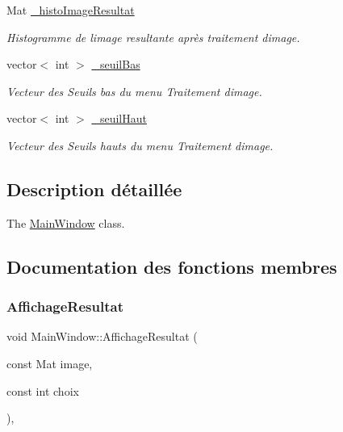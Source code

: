 \begin{DoxyCompactItemize}
\mbox{\label{classMainWindow_a4b3f8fe0c509133a0781edf94c0ae32e}} 
Mat \hyperlink{classMainWindow_a4b3f8fe0c509133a0781edf94c0ae32e}{\+\_\+histo\+Image\+Resultat}
\begin{DoxyCompactList}\small\item\em Histogramme de l\textquotesingle{}image resultante après traitement d\textquotesingle{}image. \end{DoxyCompactList}\item 
\mbox{\label{classMainWindow_aee7331f7bf3b93d7992c57688ce5a181}} 
vector$<$ int $>$ \hyperlink{classMainWindow_aee7331f7bf3b93d7992c57688ce5a181}{\+\_\+seuil\+Bas}
\begin{DoxyCompactList}\small\item\em Vecteur des Seuils bas du menu Traitement d\textquotesingle{}image. \end{DoxyCompactList}\item 
\mbox{\label{classMainWindow_a3f1d161a1e50f63886103e22630212fb}} 
vector$<$ int $>$ \hyperlink{classMainWindow_a3f1d161a1e50f63886103e22630212fb}{\+\_\+seuil\+Haut}
\begin{DoxyCompactList}\small\item\em Vecteur des Seuils hauts du menu Traitement d\textquotesingle{}image. \end{DoxyCompactList}\end{DoxyCompactItemize}


\subsection{Description détaillée}
The \hyperlink{classMainWindow}{Main\+Window} class. 

\subsection{Documentation des fonctions membres}
\mbox{\label{classMainWindow_a6a5fc1b965e50e296003a94a73fea202}} 
\subsubsection{\texorpdfstring{Affichage\+Resultat}{AffichageResultat}}
{\footnotesize\ttfamily void Main\+Window\+::\+Affichage\+Resultat (\begin{DoxyParamCaption}\item[{const Mat}]{image,  }\item[{const int}]{choix }\end{DoxyParamCaption})\hspace{0.3cm}{\ttfamily [private]}, {\ttfamily [slot]}}



